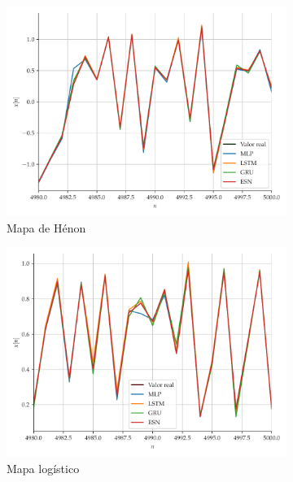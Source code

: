 \documentclass[a4paper, 12pt]{article}
\begin{document}
\begin{figure}[H]
     \begin{subfigure}[t]{0.4\textwidth} 
     \centering
         \includegraphics[scale=0.35]{vs-henon-zoom.pdf}
         \caption{Mapa de Hénon}
     \end{subfigure}
     \centering
     \begin{subfigure}[t]{0.4\textwidth} 
     \centering
         \includegraphics[scale=0.35]{vs-logistic-zoom.pdf}
         \caption{Mapa logístico}
     \end{subfigure}
     \centering
     \\
     \begin{subfigure}[t]{0.4\textwidth} 
     \centering

\end{subfigure}
\end{figure}
\end{document}
